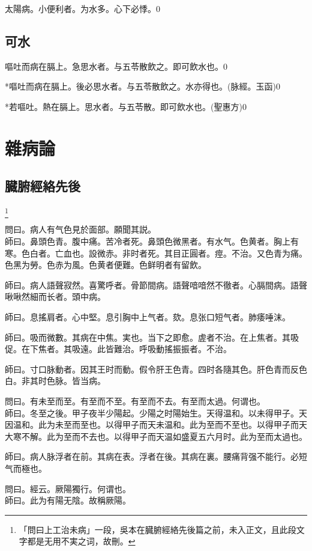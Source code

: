 \documentclass[b5paper,twoside,zihao=-4,UTF8]{ctexbook}
\begin{document}
太陽病。小便利者。为水多。心下必悸。0

\chapter{可水}

嘔吐而病在膈上。急思水者。与五苓散飲之。即可飲水也。0

*嘔吐而病在膈上。後必思水者。与五苓散飲之。水亦得也。(脉經。玉函)0

*若嘔吐。熱在膈上。思水者。与五苓散。即可飲水也。(聖惠方)0

\part{雜病論}

\chapter{臓腑經絡先後}

	\footnote{「問曰上工治未病」一段，吳本在臓腑經絡先後篇之前，未入正文，且此段文字都是无用不実之词，故刪。}

問曰。病人有气色見於面部。願聞其説。\\
師曰。鼻頭色青。腹中痛。苦冷者死。鼻頭色微黑者。有水气。色黄者。胸上有寒。色白者。亡血也。設微赤。非时者死。其目正圓者。痙。不治。又色青为痛。色黑为勞。色赤为風。色黄者便難。色鲜明者有留飲。

師曰。病人語聲寂然。喜驚呼者。骨節間病。語聲喑喑然不徹者。心膈間病。語聲啾啾然細而长者。頭中病。

師曰。息搖肩者。心中堅。息引胸中上气者。欬。息张口短气者。肺痿唾沫。

師曰。吸而微數。其病在中焦。実也。当下之即愈。虗者不治。在上焦者。其吸促。在下焦者。其吸遠。此皆難治。呼吸動搖振振者。不治。

師曰。寸口脉動者。因其王时而動。假令肝王色青。四时各隨其色。肝色青而反色白。非其时色脉。皆当病。

問曰。有未至而至。有至而不至。有至而不去。有至而太過。何谓也。\\
師曰。冬至之後。甲子夜半少陽起。少陽之时陽始生。天得温和。以未得甲子。天因温和。此为未至而至也。以得甲子而天未温和。此为至而不至也。以得甲子而天大寒不解。此为至而不去也。以得甲子而天温如盛夏五六月时。此为至而太過也。

師曰。病人脉浮者在前。其病在表。浮者在後。其病在裏。腰痛背强不能行。必短气而極也。

問曰。經云。厥陽獨行。何谓也。\\
師曰。此为有陽无陰。故稱厥陽。
\end{document}
